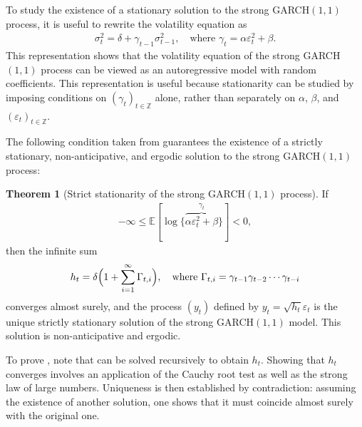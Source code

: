 \documentclass[12pt,a4paper]{article}
\theoremstyle{definition}
\newtheorem{theorem}{Theorem}[section]
\begin{document}
To study the existence of a stationary solution to the strong GARCH$(1,1)$ process, it is useful to rewrite the volatility equation as
\begin{align}
\label{RandomCoeffScalarGARCH}
    \sigma_t^2 = \delta + \gamma_{t-1} \sigma_{t-1}^2, \quad \text{where }\gamma_t=\alpha\varepsilon_t^2+\beta.
\end{align}
This representation shows that the volatility equation of the strong GARCH$(1,1)$ process can be viewed as an autoregressive model with random coefficients. This representation is useful because stationarity can be studied by imposing conditions on $(\gamma_t)_{t\in\mathbb{Z}}$ alone, rather than separately on $\alpha$, $\beta$, and $(\varepsilon_t)_{t\in\mathbb{Z}}$.

The following condition taken from \citet{francq2019garch} guarantees the existence of a strictly stationary, non-anticipative, and ergodic solution to the strong GARCH$(1,1)$ process:
\begin{theorem}[Strict stationarity of the strong GARCH$(1,1)$ process]
\label{stationarityscalarGARCH11}
    If
    \begin{gather}
        -\infty\leq\mathbb{E}[ \log\{\overbrace{\alpha\varepsilon_t^2+\beta}^{\gamma_t}\}]<0,
    \end{gather}
    then the infinite sum
    \begin{gather}
        h_t = \delta \Bigl(1 + \sum_{i=1}^{\infty}\Gamma_{t,i}\Bigr), \quad \text{where }\Gamma_{t,i}=\gamma_{t-1}\gamma_{t-2}\cdots\gamma_{t-i}
    \end{gather}
    converges almost surely, and the process $(y_t)$ defined by $y_t=\sqrt{h_t}\varepsilon_t$ is the unique strictly stationary solution of the strong GARCH$(1,1)$ model. This solution is non-anticipative and ergodic.
\end{theorem}
To prove , note that  can be solved recursively to obtain $h_t$. Showing that $h_t$ converges involves an application of the Cauchy root test as well as the strong law of large numbers. Uniqueness is then established by contradiction: assuming the existence of another solution, one shows that it must coincide almost surely with the original one.
\end{document}
